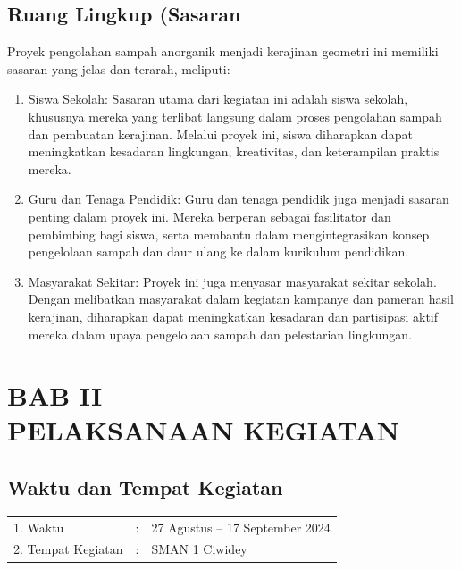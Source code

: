 \documentclass[a4paper,12pt, bahasa]{article}
\begin{document}
\subsection{Ruang Lingkup (Sasaran}
Proyek pengolahan sampah anorganik menjadi kerajinan geometri ini memiliki sasaran yang jelas dan terarah, meliputi: 
\begin{enumerate}
    \item     Siswa Sekolah: Sasaran utama dari kegiatan ini adalah siswa sekolah, khususnya mereka yang terlibat langsung dalam proses pengolahan sampah dan pembuatan kerajinan. Melalui proyek ini, siswa diharapkan dapat meningkatkan kesadaran lingkungan, kreativitas, dan keterampilan praktis mereka. 
    \item     Guru dan Tenaga Pendidik: Guru dan tenaga pendidik juga menjadi sasaran penting dalam proyek ini. Mereka berperan sebagai fasilitator dan pembimbing bagi siswa, serta membantu dalam mengintegrasikan konsep pengelolaan sampah dan daur ulang ke dalam kurikulum pendidikan. 
    \item     Masyarakat Sekitar: Proyek ini juga menyasar masyarakat sekitar sekolah. Dengan melibatkan masyarakat dalam kegiatan kampanye dan pameran hasil kerajinan, diharapkan dapat meningkatkan kesadaran dan partisipasi aktif mereka dalam upaya pengelolaan sampah dan pelestarian lingkungan. 
\end{enumerate}
\pagebreak
    \section*{BAB II\\PELAKSANAAN KEGIATAN}
\setcounter{section}{2}
 \setcounter{subsection}{0}
\subsection{Waktu dan Tempat Kegiatan}

 \begin{table}[ht]
     \centering
     \begin{tabular}{lll}
          1. Waktu&:  &27 Agustus -- 17 September 2024 \\
          2. Tempat Kegiatan&:  & SMAN 1 Ciwidey \\
     \end{tabular}
 \end{table}
\end{document}
